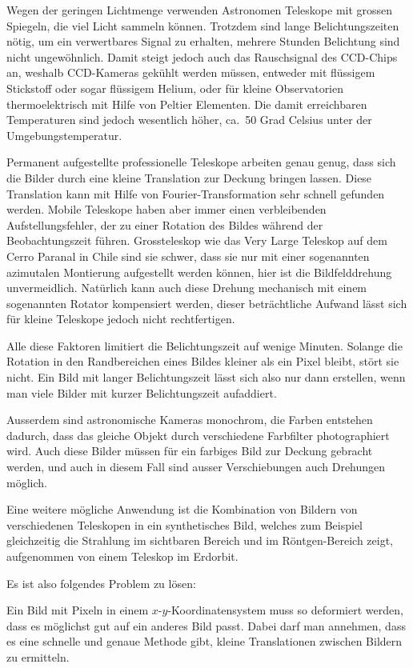 Wegen der geringen Lichtmenge verwenden Astronomen Teleskope mit
grossen Spiegeln, die viel Licht sammeln können. Trotzdem sind lange
Belichtungszeiten nötig, um ein verwertbares Signal zu erhalten,
mehrere Stunden Belichtung sind nicht ungewöhnlich.
Damit steigt jedoch auch das Rauschsignal des CCD-Chips an, weshalb
CCD-Kameras gekühlt werden müssen, entweder mit flüssigem Stickstoff
oder sogar flüssigem Helium, oder für kleine Observatorien thermoelektrisch
mit Hilfe von Peltier Elementen.
Die damit erreichbaren Temperaturen sind jedoch wesentlich höher,
ca.~50 Grad Celsius unter der Umgebungstemperatur.

Permanent aufgestellte professionelle Teleskope arbeiten genau
genug, dass sich die Bilder durch eine kleine Translation zur
Deckung bringen lassen.
Diese Translation kann mit Hilfe von Fourier-Transformation sehr
schnell gefunden werden.
Mobile Teleskope haben aber immer einen verbleibenden Aufstellungsfehler,
der zu einer Rotation des Bildes während der Beobachtungszeit führen.
Grossteleskop wie das Very Large Teleskop auf dem Cerro Paranal in
Chile sind sie schwer, dass sie nur mit einer sogenannten azimutalen
Montierung aufgestellt werden können, hier ist die Bildfelddrehung
unvermeidlich.
Natürlich kann auch diese Drehung mechanisch mit einem sogenannten
Rotator kompensiert werden, dieser beträchtliche Aufwand lässt sich
für kleine Teleskope jedoch nicht rechtfertigen.

Alle diese Faktoren limitiert die Belichtungszeit auf wenige Minuten.
Solange die Rotation in den
Randbereichen eines Bildes kleiner als ein Pixel bleibt, stört
sie nicht.
Ein Bild mit langer Belichtungszeit lässt sich also nur dann erstellen,
wenn man viele Bilder mit kurzer Belichtungszeit aufaddiert.

Ausserdem sind astronomische Kameras monochrom, die Farben entstehen
dadurch, dass das gleiche Objekt durch verschiedene Farbfilter photographiert
wird. Auch diese Bilder müssen für ein farbiges Bild zur Deckung
gebracht werden, und auch in diesem Fall sind ausser Verschiebungen
auch Drehungen möglich. 

Eine weitere mögliche Anwendung ist die Kombination von Bildern von
verschiedenen Teleskopen in ein synthetisches Bild, welches zum Beispiel
gleichzeitig die Strahlung im sichtbaren Bereich und im Röntgen-Bereich
zeigt, aufgenommen von einem Teleskop im Erdorbit.

Es ist also folgendes Problem zu lösen:

\begin{aufgabe}
Ein Bild mit Pixeln in einem
$x$-$y$-Koordinatensystem muss so deformiert werden, dass es möglichst
gut auf ein anderes Bild passt. Dabei darf man annehmen, dass es eine
schnelle und genaue Methode gibt, kleine Translationen zwischen Bildern 
zu ermitteln.
\end{aufgabe}

